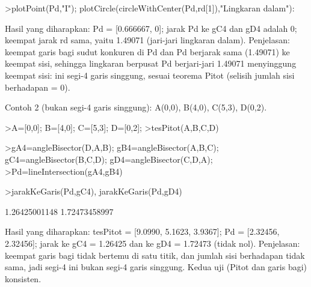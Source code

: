 \documentclass[a4paper,10pt]{article}
\begin{document}
\begin{eulernotebook}
\begin{eulercomment}
\begin{eulercomment}
\begin{eulercomment}
\begin{eulercomment}
\begin{eulercomment}
\begin{eulercomment}
\begin{eulercomment}
\begin{eulercomment}
\begin{eulercomment}
\begin{eulercomment}
\begin{eulercomment}
\begin{eulercomment}
\begin{eulercomment}
\begin{eulercomment}
\begin{eulercomment}
\begin{eulercomment}
\begin{eulercomment}
\begin{eulercomment}
\begin{eulercomment}
\begin{eulercomment}
\begin{euleroutput}
  [1.49071,  1.49071,  1.49071,  1.49071]
\end{euleroutput}
\begin{eulerprompt}
>plotPoint(Pd,"I"); plotCircle(circleWithCenter(Pd,rd[1]),"Lingkaran dalam"):
\end{eulerprompt}
\begin{eulercomment}
Hasil yang diharapkan: Pd = [0.666667, 0]; jarak Pd ke gC4 dan gD4 adalah 0; keempat jarak
rd sama, yaitu 1.49071 (jari-jari lingkaran dalam).
Penjelasan: keempat garis bagi sudut konkuren di Pd dan Pd berjarak sama (1.49071) ke keempat sisi,
sehingga lingkaran berpusat Pd berjari-jari 1.49071 menyinggung keempat sisi: ini segi-4 garis
singgung, sesuai teorema Pitot (selisih jumlah sisi berhadapan = 0).

Contoh 2 (bukan segi-4 garis singgung): A(0,0), B(4,0), C(5,3), D(0,2).
\end{eulercomment}
\begin{eulerprompt}
>A=[0,0]; B=[4,0]; C=[5,3]; D=[0,2];
>tesPitot(A,B,C,D)
\end{eulerprompt}
\begin{euleroutput}
  [9.09902,  5.16228,  3.93674]
\end{euleroutput}
\begin{eulerprompt}
>gA4=angleBisector(D,A,B); gB4=angleBisector(A,B,C); gC4=angleBisector(B,C,D); gD4=angleBisector(C,D,A);
>Pd=lineIntersection(gA4,gB4)
\end{eulerprompt}
\begin{euleroutput}
  [2.32456,  2.32456]
\end{euleroutput}
\begin{eulerprompt}
>jarakKeGaris(Pd,gC4), jarakKeGaris(Pd,gD4)
\end{eulerprompt}
\begin{euleroutput}
  1.26425001148
  1.72473458997
\end{euleroutput}
\begin{eulercomment}
Hasil yang diharapkan: tesPitot = [9.0990, 5.1623, 3.9367]; Pd = [2.32456, 2.32456]; jarak ke
gC4 = 1.26425 dan ke gD4 = 1.72473 (tidak nol).
Penjelasan: keempat garis bagi tidak bertemu di satu titik, dan jumlah sisi berhadapan tidak
sama, jadi segi-4 ini bukan segi-4 garis singgung. Kedua uji (Pitot dan garis bagi) konsisten.


\end{eulercomment}
\end{eulercomment}
\end{eulercomment}
\end{eulercomment}
\end{eulercomment}
\end{eulercomment}
\end{eulercomment}
\end{eulercomment}
\end{eulercomment}
\end{eulercomment}
\end{eulercomment}
\end{eulercomment}
\end{eulercomment}
\end{eulercomment}
\end{eulercomment}
\end{eulercomment}
\end{eulercomment}
\end{eulercomment}
\end{eulercomment}
\end{eulercomment}
\end{eulercomment}
\end{eulernotebook}
\end{document}
